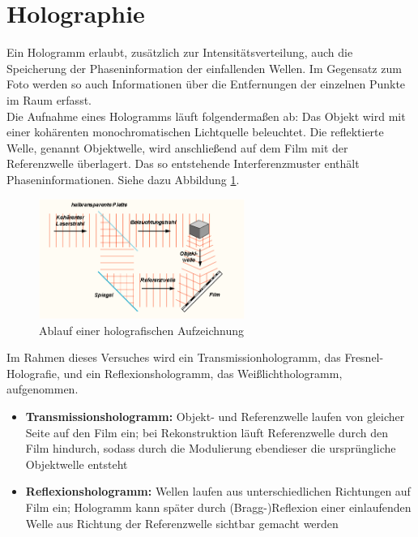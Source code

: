     \section{Holographie}
Ein Hologramm erlaubt, zusätzlich zur Intensitätsverteilung, auch die Speicherung
der Phaseninformation der einfallenden Wellen. Im Gegensatz zum Foto werden so
auch Informationen über die Entfernungen der einzelnen Punkte im Raum erfasst.\\
Die Aufnahme eines Hologramms läuft folgendermaßen ab:
Das Objekt wird mit einer kohärenten monochromatischen Lichtquelle beleuchtet. 
Die reflektierte Welle, genannt Objektwelle, wird anschließend auf dem Film mit der 
Referenzwelle überlagert. Das so entstehende Interferenzmuster enthält 
Phaseninformationen.
Siehe dazu Abbildung \ref{holo1}.
\begin{figure}
   \centering
   \includegraphics[width=0.6\textwidth]{Abb/holo_ablauf.png} 
   \caption{Ablauf einer holografischen Aufzeichnung}
   \label{holo1}
\end{figure}
Im Rahmen dieses Versuches wird ein Transmissionhologramm, das Fresnel-Holografie,
und ein Reflexionshologramm, das Weißlichthologramm, aufgenommen.
    \begin{itemize}
        \item \textbf{Transmissionshologramm:} Objekt- und Referenzwelle 
        laufen von gleicher Seite auf den Film ein; bei Rekonstruktion 
        läuft Referenzwelle durch den Film hindurch, sodass durch die 
        Modulierung ebendieser die ursprüngliche Objektwelle entsteht
        \item \textbf{Reflexionshologramm:} Wellen laufen aus unterschiedlichen
        Richtungen auf Film ein; Hologramm kann später durch (Bragg-)Reflexion
        einer einlaufenden Welle aus Richtung der Referenzwelle sichtbar gemacht werden
    \end{itemize}


